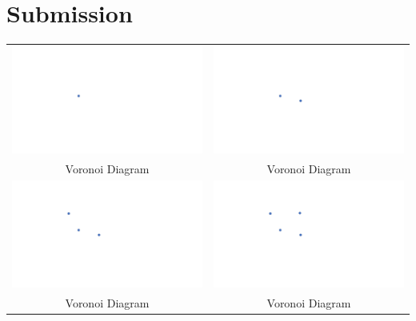 \documentclass[a4paper,12pt]{article}
\begin{document}
\section{Submission}



\newpage

\begin{tabular}{|c|c|}
\hline
\hspace{10pt}\includegraphics[width=0.425\linewidth]{../images/voronoi1.pdf}\hspace{10pt} & \hspace{10pt}\includegraphics[width=0.425\linewidth]{../images/voronoi2.pdf}\hspace{10pt} \\
Voronoi Diagram & Voronoi Diagram \\
\hline
\hspace{10pt}\includegraphics[width=0.425\linewidth]{../images/voronoi3.pdf}\hspace{10pt} & \hspace{10pt}\includegraphics[width=0.425\linewidth]{../images/voronoi4.pdf}\hspace{10pt} \\
Voronoi Diagram & Voronoi Diagram \\
\hline
\end{tabular}
\end{document}
